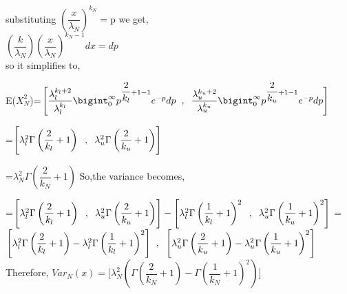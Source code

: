\documentclass[12pt,a4paper,oneside]{article}
\begin{document}
substituting $\left(\dfrac{x}{{\lambda_{N}}}\right)^{k_{N}}=$p we get,\\
\newline
\hspace{2cm}$\left(\dfrac{k}{\lambda_{N}}\right)\left(\dfrac{x}{{\lambda_{N}}}\right)^{k_{N}-1}dx=dp$\\
\newline so it simplifies to,
\begin{center}
E($X_{N}^{2}$)=$\Biggl[\dfrac{\lambda_{l}^{k_{l}+2}}{\lambda_{l}^{k_{l}}} \bigint_{0}^{\infty} p^{\dfrac{2}{k_{l}}+1-1}e^{-p}dp\hspace{2mm},\hspace{2mm}\dfrac{\lambda_{u}^{k_{u}+2}}{\lambda_{u}^{k_{u}}} \bigint_{0}^{\infty} p^{\dfrac{2}{k_{u}}+1-1}e^{-p}dp\Biggr]$
\end{center}
\begin{singlespace}
\hspace*{4.5cm}=$\Biggl[{\lambda_{l}^{2}}\Gamma\left(\dfrac{2}{k_{l}}+1\right)\hspace{2mm},\hspace{2mm}{\lambda_{u}^{2}}\Gamma\left(\dfrac{2}{k_{u}}+1\right)\Biggr]$
\end{singlespace}
\hspace*{4.5cm}=$\boxed{{\lambda_{N}^{2}}\Gamma\left(\dfrac{2}{k_{N}}+1\right)}$
\newline\newline
So,the variance becomes,\\
\begin{center}
=$\Biggl[{\lambda_{l}^{2}}\Gamma\left(\dfrac{2}{k_{l}}+1\right)\hspace{2mm},\hspace{2mm}{\lambda_{u}^{2}}\Gamma\left(\dfrac{2}{k_{u}}+1\right)\Biggr]-\Biggl[{\lambda_{l}^{2}}\Gamma\left(\dfrac{1}{k_{l}}+1\right)^{2}\hspace{2mm},\hspace{2mm}{\lambda_{u}^{2}}\Gamma\left(\dfrac{1}{k_{u}}+1\right)^{2}\Biggr]$\newline\newline\newline
=$\Biggl[{\lambda_{l}^{2}}\Gamma\left(\dfrac{2}{k_{l}}+1\right)-{\lambda_{l}^{2}}\Gamma\left(\dfrac{1}{k_{l}}+1\right)^{2}\Biggr]\hspace{2mm},\hspace{2mm}\Biggl[{\lambda_{u}^{2}}\Gamma\left(\dfrac{2}{k_{u}}+1\right)-{\lambda_{u}^{2}}\Gamma\left(\dfrac{1}{k_{u}}+1\right)^{2}\Biggr]$\newline\newline\newline\newline Therefore,\hspace{2mm}
$\boxed{Var_{N}(x)=\Biggl[{\lambda_{N}^{2}}\left(\Gamma\left(\dfrac{2}{k_{N}}+1\right)-\Gamma\left(\dfrac{1}{k_{N}}+1\right)^{2}\right)\Biggr]}$
\end{center}
\end{document}
